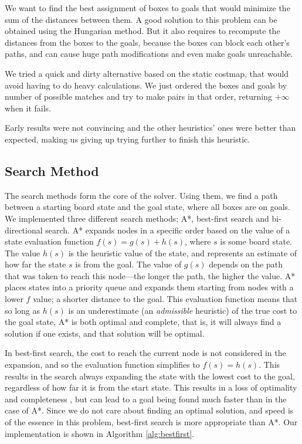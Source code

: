 \documentclass[a4paper,11pt]{article}
\begin{document}
We want to find the best assignment of boxes to goals that would minimize the
sum of the distances between them. A good solution to this problem can be 
obtained using the Hungarian method. But it also requires to recompute the
distances from the boxes to the goals, because the boxes can block each other's
paths, and can cause huge path modifications and even make goals unreachable.

We tried a quick and dirty alternative based on the static costmap, that would
avoid having to do heavy calculations. We just ordered the boxes and goals by 
number of possible matches and try to make pairs in that order, returning 
$+\infty$ when it fails.

Early results were not convincing and the other heuristics' ones were better
than expected, making us giving up trying further to finish this heuristic.


\subsection{Search Method}
The search methods form the core of the solver. Using them, we find a path
between a starting board state and the goal state, where all boxes are on
goals. We implemented three different search methods; A*, best-first search and
bi-directional search. A* expands nodes in a specific order based on the value
of a state evaluation function $f(s)=g(s)+h(s)$, where $s$ is some board
state. The value $h(s)$ is the heuristic value of the state, and represents an
estimate of how far the state $s$ is from the goal. The value of $g(s)$ depends
on the path that was taken to reach this node---the longer the path, the higher
the value. A* places states into a priority queue and expands them starting from
nodes with a lower $f$ value; a shorter distance to the goal. This evaluation
function means that so long as $h(s)$ is an underestimate (an \emph{admissible}
heuristic) of the true cost to the goal state, A* is both optimal and complete,
that is, it will always find a solution if one exists, and that solution will be
optimal\cite{aima}.

In best-first search, the cost to reach the current node is not considered in
the expansion, and so the evaluation function simplifies to $f(s)=h(s)$. This
results in the search always expanding the state with the lowest cost to the
goal, regardless of how far it is from the start state. This results in a loss
of optimality and completeness \cite{aima}, but can lead to a goal being found
much faster than in the case of A*. Since we do not care about finding an
optimal solution, and speed is of the essence in this problem, best-first search
is more appropriate than A*. Our implementation is shown in Algorithm
\ref{alg:bestfirst}.
\end{document}
